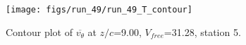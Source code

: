 \begin{figure}[H]
\centering
\texttt{[image: figs/run\_49/run\_49\_T\_contour]}
\caption{Contour plot of $\overline{v_{\theta}}$ at $z/c$=9.00, $V_{free}$=31.28, station 5.}
\label{fig:run_49_T_contour}
\end{figure}


